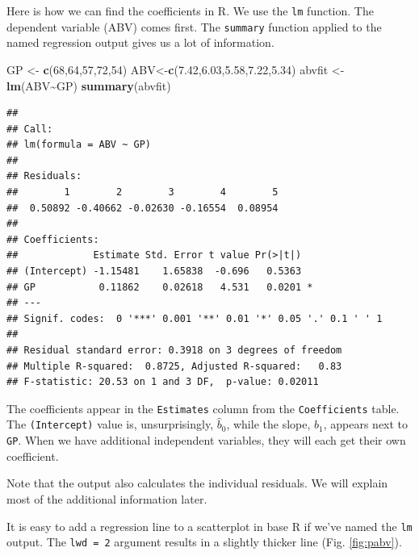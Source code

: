 \documentclass[
]{book}
\newenvironment{Shaded}{\begin{snugshade}}{\end{snugshade}}
\newcommand{\DecValTok}[1]{\textcolor[rgb]{0.00,0.00,0.81}{#1}}
\newcommand{\FloatTok}[1]{\textcolor[rgb]{0.00,0.00,0.81}{#1}}
\newcommand{\FunctionTok}[1]{\textcolor[rgb]{0.13,0.29,0.53}{\textbf{#1}}}
\newcommand{\NormalTok}[1]{#1}
\newcommand{\OtherTok}[1]{\textcolor[rgb]{0.56,0.35,0.01}{#1}}
\newcommand{\SpecialCharTok}[1]{\textcolor[rgb]{0.81,0.36,0.00}{\textbf{#1}}}
\theoremstyle{definition}
\theoremstyle{definition}
\theoremstyle{definition}
\theoremstyle{definition}
\theoremstyle{remark}
\begin{document}
Here is how we can find the coefficients in R. We use the \texttt{lm} function. The dependent variable (ABV) comes first. The \texttt{summary} function applied to the named regression output gives us a lot of information.

\begin{Shaded}
\begin{Highlighting}[]
\NormalTok{GP }\OtherTok{\textless{}{-}} \FunctionTok{c}\NormalTok{(}\DecValTok{68}\NormalTok{,}\DecValTok{64}\NormalTok{,}\DecValTok{57}\NormalTok{,}\DecValTok{72}\NormalTok{,}\DecValTok{54}\NormalTok{)}
\NormalTok{ABV}\OtherTok{\textless{}{-}}\FunctionTok{c}\NormalTok{(}\FloatTok{7.42}\NormalTok{,}\FloatTok{6.03}\NormalTok{,}\FloatTok{5.58}\NormalTok{,}\FloatTok{7.22}\NormalTok{,}\FloatTok{5.34}\NormalTok{)}
\NormalTok{abvfit }\OtherTok{\textless{}{-}} \FunctionTok{lm}\NormalTok{(ABV}\SpecialCharTok{\textasciitilde{}}\NormalTok{GP)}
\FunctionTok{summary}\NormalTok{(abvfit)}
\end{Highlighting}
\end{Shaded}

\begin{verbatim}
## 
## Call:
## lm(formula = ABV ~ GP)
## 
## Residuals:
##        1        2        3        4        5 
##  0.50892 -0.40662 -0.02630 -0.16554  0.08954 
## 
## Coefficients:
##             Estimate Std. Error t value Pr(>|t|)  
## (Intercept) -1.15481    1.65838  -0.696   0.5363  
## GP           0.11862    0.02618   4.531   0.0201 *
## ---
## Signif. codes:  0 '***' 0.001 '**' 0.01 '*' 0.05 '.' 0.1 ' ' 1
## 
## Residual standard error: 0.3918 on 3 degrees of freedom
## Multiple R-squared:  0.8725, Adjusted R-squared:   0.83 
## F-statistic: 20.53 on 1 and 3 DF,  p-value: 0.02011
\end{verbatim}

The coefficients appear in the \texttt{Estimates} column from the \texttt{Coefficients} table. The \texttt{(Intercept)} value is, unsurprisingly, \(\hat{b}_0\), while the slope, \(\hat{b}_1\), appears next to \texttt{GP}. When we have additional independent variables, they will each get their own coefficient.

Note that the output also calculates the individual residuals. We will explain most of the additional information later.

It is easy to add a regression line to a scatterplot in base R if we've named the \texttt{lm} output. The \texttt{lwd\ =\ 2} argument results in a slightly thicker line (Fig. \ref{fig:pabv}).
\end{document}

